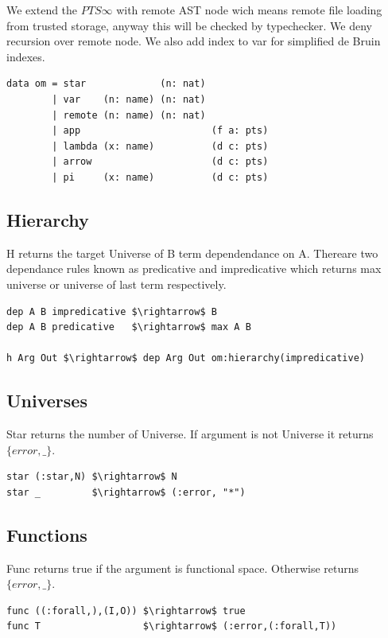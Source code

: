 \documentclass[11pt,oneside]{article}
\begin{document}
We extend the $PTS\infty$ with remote AST node wich means remote file loading
from trusted storage, anyway this will be checked by typechecker. We deny recursion
over remote node. We also add index to var for simplified de Bruin indexes.

\begin{lstlisting}[mathescape=true]
data om = star             (n: nat)
        | var    (n: name) (n: nat)
        | remote (n: name) (n: nat)
        | app                       (f a: pts)
        | lambda (x: name)          (d c: pts)
        | arrow                     (d c: pts)
        | pi     (x: name)          (d c: pts)
\end{lstlisting}

\newpage

\subsection{Hierarchy}
H returns the target Universe of B term dependendance on A. Thereare two dependance rules known
as predicative and impredicative which returns max universe or universe of last term respectively.

\begin{lstlisting}[mathescape=true]
dep A B impredicative $\rightarrow$ B
dep A B predicative   $\rightarrow$ max A B

h Arg Out $\rightarrow$ dep Arg Out om:hierarchy(impredicative)
\end{lstlisting}

\subsection{Universes}
Star returns the number of Universe. If argument is not Universe it returns $\{error,\_\}$.

\begin{lstlisting}[mathescape=true]
star (:star,N) $\rightarrow$ N
star _         $\rightarrow$ (:error, "*")
\end{lstlisting}

\subsection{Functions}
Func returns true if the argument is functional space. Otherwise returns $\{error,\_\}$.

\begin{lstlisting}[mathescape=true]
func ((:forall,),(I,O)) $\rightarrow$ true
func T                  $\rightarrow$ (:error,(:forall,T))
\end{lstlisting}
\end{document}
